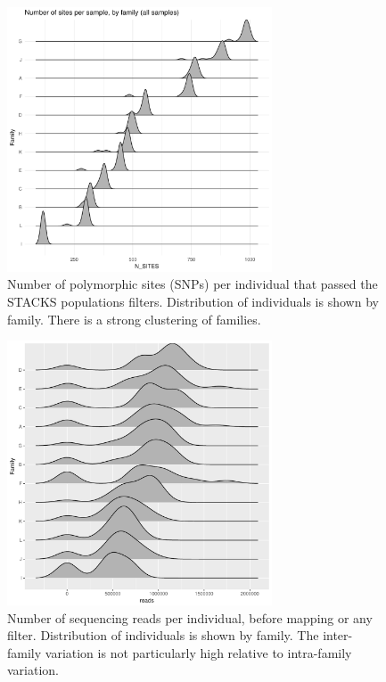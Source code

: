 \documentclass[10pt,a4paper]{report}
\begin{document}
\begin{figure}[h]
	\begin{center}
		\includegraphics[width=0.7\textwidth]{coverage_analysis/sites_per_sample.pdf}
		\caption{Number of polymorphic sites (SNPs) per individual that passed the STACKS populations filters. Distribution of individuals is shown by family. There is a strong clustering of families.}
		\label{sites_fam}
	\end{center}
\end{figure}


\begin{figure}[h]
	\begin{center}
		\includegraphics[width=0.7\textwidth]{coverage_analysis/reads_sample.pdf}
		\caption{Number of sequencing reads per individual, before mapping or any filter. Distribution of individuals is shown by family. The inter-family variation is not particularly high relative to intra-family variation.}
		\label{reads_fam}
	\end{center}
\end{figure}
\end{document}
